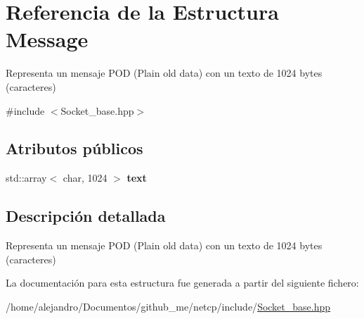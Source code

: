 \hypertarget{structMessage}{}\section{Referencia de la Estructura Message}
\label{structMessage}


Representa un mensaje P\+OD (Plain old data) con un texto de 1024 bytes (caracteres)  




{\ttfamily \#include $<$Socket\+\_\+base.\+hpp$>$}

\subsection*{Atributos públicos}
\begin{DoxyCompactItemize}
\item 
\mbox{\label{structMessage_a8398aec0171dec03c496704e79fd0022}} 
std\+::array$<$ char, 1024 $>$ {\bfseries text}
\end{DoxyCompactItemize}


\subsection{Descripción detallada}
Representa un mensaje P\+OD (Plain old data) con un texto de 1024 bytes (caracteres) 

La documentación para esta estructura fue generada a partir del siguiente fichero\+:\begin{DoxyCompactItemize}
\item 
/home/alejandro/\+Documentos/github\+\_\+me/netcp/include/\hyperlink{Socket__base_8hpp}{Socket\+\_\+base.\+hpp}\end{DoxyCompactItemize}
